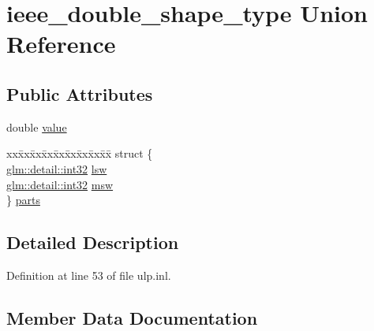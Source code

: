 \hypertarget{unionieee__double__shape__type}{}\section{ieee\+\_\+double\+\_\+shape\+\_\+type Union Reference}
\label{unionieee__double__shape__type}
\subsection*{Public Attributes}
\begin{DoxyCompactItemize}
\item 
double \hyperlink{unionieee__double__shape__type_a2d9c4cab9e3fa74e4be6d72f798a145b}{value}
\item 
\begin{tabbing}
xx\=xx\=xx\=xx\=xx\=xx\=xx\=xx\=xx\=\kill
struct \{\\
\>\hyperlink{namespaceglm_1_1detail_a9f85b4efeca416cdcec2fd08939a2e17}{glm::detail::int32} \hyperlink{unionieee__double__shape__type_a15dfdc2d74a323f6638204624834f101}{lsw}\\
\>\hyperlink{namespaceglm_1_1detail_a9f85b4efeca416cdcec2fd08939a2e17}{glm::detail::int32} \hyperlink{unionieee__double__shape__type_aea1156759f6afd58a56a7b4e7bfcee01}{msw}\\
\} \hyperlink{unionieee__double__shape__type_a6040e16c8358a21f8e91a578384ead5b}{parts}\\

\end{tabbing}\end{DoxyCompactItemize}


\subsection{Detailed Description}


Definition at line 53 of file ulp.\+inl.



\subsection{Member Data Documentation}
\mbox{\label{unionieee__double__shape__type_a15dfdc2d74a323f6638204624834f101}} 
